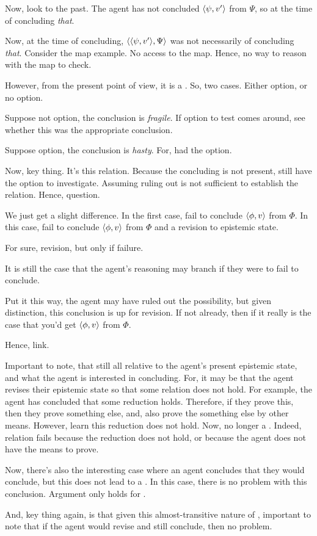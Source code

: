 \begin{note}
  Now, look to the past.
  The agent has not concluded \(\langle \psi, v' \rangle\) from \(\Psi\), so at the time of concluding \emph{that}.

  Now, at the time of concluding, \(\langle \langle \psi, v' \rangle, \Psi \rangle\) was not necessarily \requ{} of concluding \emph{that}.
  Consider the map example.
  No access to the map.
  Hence, no way to reason with the map to check.

  However, from the present point of view, it is a \requ{}.
  So, two cases.
  Either option, or no option.

  Suppose not option, the conclusion is \emph{fragile}.
  If option to test comes around, see whether this was the appropriate conclusion.

  Suppose option, the conclusion is \emph{hasty}.
  For, had the option.

  Now, key thing.
  It's this relation.
  Because the concluding is not present, still have the option to investigate.
  Assuming ruling out is not sufficient to establish the relation.
  Hence, question.

  We just get a slight difference.
  In the first case, fail to conclude \(\langle \phi, v \rangle\) from \(\Phi\).
  In this case, fail to conclude \(\langle \phi, v \rangle\) from \(\Phi\) and a revision to epistemic state.

  For sure, revision, but only if failure.

  It is still the case that the agent's reasoning may branch if they were to fail to conclude.

  Put it this way, the agent may have ruled out the possibility, but given distinction, this conclusion is up for revision.
  If not already, then if it really is the case that you'd get \(\langle \phi, v \rangle\) from \(\Phi\).
\end{note}

\begin{note}
  Hence, link.

  Important to note, that still all relative to the agent's present epistemic state, and what the agent is interested in concluding.
  For, it may be that the agent revises their epistemic state so that some relation does not hold.
  For example, the agent has concluded that some reduction holds.
  Therefore, if they prove this, then they prove something else, and, also prove the something else by other means.
  However, learn this reduction does not hold.
  Now, no longer a \requ{}.
  Indeed, relation fails because the reduction does not hold, or because the agent does not have the means to prove.

  Now, there's also the interesting case where an agent concludes that they would conclude, but this does not lead to a \requ{}.
  In this case, there is no problem with this conclusion.
  Argument only holds for \requ{}.

  And, key thing again, is that given this almost-transitive nature of , important to note that if the agent would revise and still conclude, then no problem.
\end{note}

